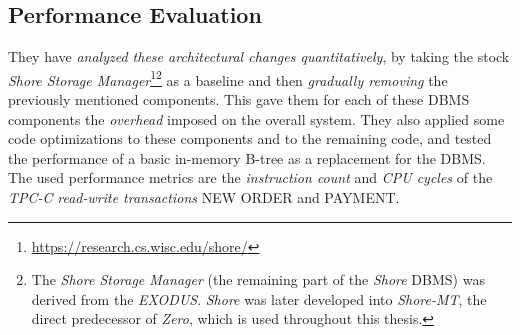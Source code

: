 \subsection{Performance Evaluation}

    They have \emph{analyzed these architectural changes quantitatively}, by taking the stock \textit{Shore Storage Manager}\footnote{\url{https://research.cs.wisc.edu/shore/}}\footnote{The \textit{Shore Storage Manager} (the remaining part of the \textit{Shore} DBMS) was derived from the \textit{EXODUS}. \textit{Shore} was later developed into \textit{Shore-MT}, the direct predecessor of \textit{Zero}, which is used throughout this thesis.} as a baseline and then \emph{gradually removing} the previously mentioned components. This gave them for each of these DBMS components the \emph{overhead} imposed on the overall system. They also applied some code optimizations to these components and to the remaining code, and tested the performance of a basic in-memory B-tree as a replacement for the DBMS. The used performance metrics are the \emph{instruction count} and \emph{CPU cycles} of the \textit{TPC-C} \emph{read-write transactions} NEW ORDER and PAYMENT.

